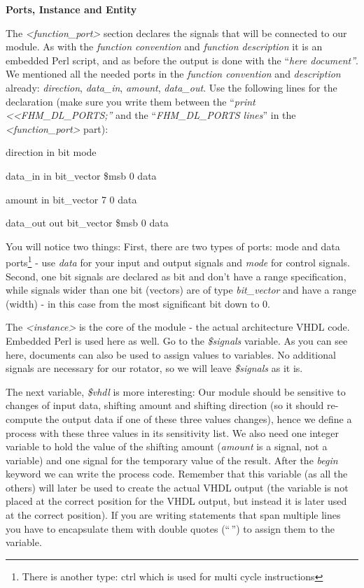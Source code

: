 \documentclass[
]{article}
\begin{document}
\textbf{Ports, Instance and Entity}

The \emph{\textless function\_port\textgreater{}} section declares the
signals that will be connected to our module. As with the \emph{function
convention} and \emph{function description} it is an embedded Perl
script, and as before the output is done with the ``\emph{here
document''}. We mentioned all the needed ports in the \emph{function
convention} and \emph{description} already: \emph{direction},
\emph{data\_in}, \emph{amount}, \emph{data\_out}. Use the following
lines for the declaration (make sure you write them between the
``\emph{print \textless\textless FHM\_DL\_PORTS;''} and the
``\emph{FHM\_DL\_PORTS lines}'' in the
\emph{\textless function\_port\textgreater{}} part):

direction in bit mode

data\_in in bit\_vector \$msb 0 data

amount in bit\_vector 7 0 data

data\_out out bit\_vector \$msb 0 data

You will notice two things: First, there are two types of ports: mode
and data ports\footnote{There is another type: ctrl which is used for
  multi cycle instructions} - use \emph{data} for your input and output
signals and \emph{mode} for control signals. Second, one bit signals are
declared as bit and don't have a range specification, while signals
wider than one bit (vectors) are of type \emph{bit\_vector} and have a
range (width) - in this case from the most significant bit down to 0.

The \emph{\textless instance\textgreater{}} is the core of the module -
the actual architecture VHDL code. Embedded Perl is used here as well.
Go to the \emph{\$signals} variable. As you can see here, documents can
also be used to assign values to variables. No additional signals are
necessary for our rotator, so we will leave \emph{\$signals} as it is.

The next variable, \emph{\$vhdl} is more interesting: Our module should
be sensitive to changes of input data, shifting amount and shifting
direction (so it should re-compute the output data if one of these three
values changes), hence we define a process with these three values in
its sensitivity list. We also need one integer variable to hold the
value of the shifting amount (\emph{amount} is a signal, not a variable)
and one signal for the temporary value of the result. After the
\emph{begin} keyword we can write the process code. Remember that this
variable (as all the others) will later be used to create the actual
VHDL output (the variable is not placed at the correct position for the
VHDL output, but instead it is later used at the correct position). If
you are writing statements that span multiple lines you have to
encapsulate them with double quotes (``\,'') to assign them to the
variable.
\end{document}
